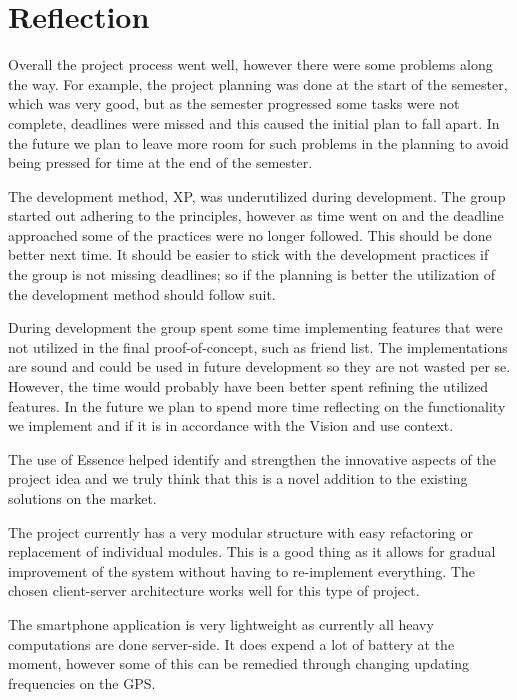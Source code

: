 \section{Reflection}
Overall the project process went well, however there were some problems along the way. For example, the project planning was done at the start of the semester, which was very good, but as the semester progressed some tasks were not complete, deadlines were missed and this caused the initial plan to fall apart. In the future we plan to leave more room for such problems in the planning to avoid being pressed for time at the end of the semester.

The development method, \ac{XP}, was underutilized during development. The group started out adhering to the principles, however as time went on and the deadline approached some of the practices were no longer followed. This should be done better next time. It should be easier to stick with the development practices if the group is not missing deadlines; so if the planning is better the utilization of the development method should follow suit.

During development the group spent some time implementing features that were not utilized in the final proof-of-concept, such as friend list. The implementations are sound and could be used in future development so they are not wasted per se. However, the time would probably have been better spent refining the utilized features. In the future we plan to spend more time reflecting on the functionality we implement and if it is in accordance with the Vision and use context.

The use of Essence helped identify and strengthen the innovative aspects of the project idea and we truly think that this is a novel addition to the existing solutions on the market.

The project currently has a very modular structure with easy refactoring or replacement of individual modules. This is a good thing as it allows for gradual improvement of the system without having to re-implement everything. The chosen client-server architecture works well for this type of project.

The smartphone application is very lightweight as currently all heavy computations are done server-side. It does expend a lot of battery at the moment, however some of this can be remedied through changing updating frequencies on the \ac{GPS}. 
